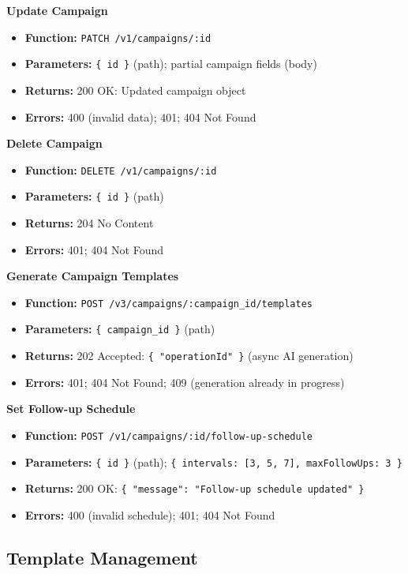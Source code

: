\documentclass[a4paper]{article}
\begin{document}
\textbf{Update Campaign}
\begin{itemize}
  \item \textbf{Function:} \texttt{PATCH /v1/campaigns/:id}
  \item \textbf{Parameters:} \texttt{\{ id \}} (path); partial campaign fields (body)
  \item \textbf{Returns:} 200 OK: Updated campaign object
  \item \textbf{Errors:} 400 (invalid data); 401; 404 Not Found
\end{itemize}

\textbf{Delete Campaign}
\begin{itemize}
  \item \textbf{Function:} \texttt{DELETE /v1/campaigns/:id}
  \item \textbf{Parameters:} \texttt{\{ id \}} (path)
  \item \textbf{Returns:} 204 No Content
  \item \textbf{Errors:} 401; 404 Not Found
\end{itemize}

\textbf{Generate Campaign Templates}
\begin{itemize}
  \item \textbf{Function:} \texttt{POST /v3/campaigns/:campaign\_id/templates}
  \item \textbf{Parameters:} \texttt{\{ campaign\_id \}} (path)
  \item \textbf{Returns:} 202 Accepted: \texttt{\{ "operationId" \}} (async AI generation)
  \item \textbf{Errors:} 401; 404 Not Found; 409 (generation already in progress)
\end{itemize}

\textbf{Set Follow-up Schedule}
\begin{itemize}
  \item \textbf{Function:} \texttt{POST /v1/campaigns/:id/follow-up-schedule}
  \item \textbf{Parameters:} \texttt{\{ id \}} (path); \texttt{\{ intervals: [3, 5, 7], maxFollowUps: 3 \}}
  \item \textbf{Returns:} 200 OK: \texttt{\{ "message": "Follow-up schedule updated" \}}
  \item \textbf{Errors:} 400 (invalid schedule); 401; 404 Not Found
\end{itemize}

\subsection{Template Management}
\end{document}
